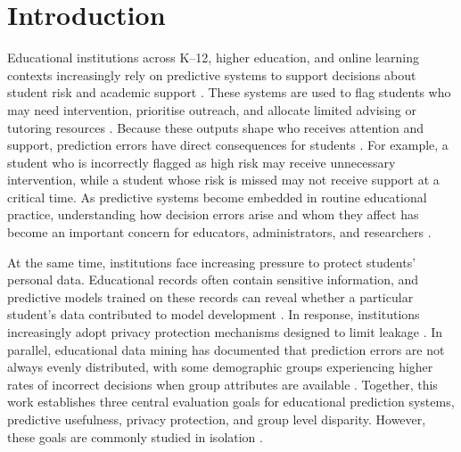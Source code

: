 \documentclass{edm_article}
\begin{document}

\section{Introduction}
Educational institutions across K–12, higher education, and online learning contexts increasingly rely on predictive systems to support decisions about student risk and academic support \cite{20hlosta2022_predictive_la_errors}. These systems are used to flag students who may need intervention, prioritise outreach, and allocate limited advising or tutoring resources \cite{3plak2022_ews_dashboard,17susnjak2022_la_dashboard_actionable}. Because these outputs shape who receives attention and support, prediction errors have direct consequences for students \cite{17susnjak2022_la_dashboard_actionable,20hlosta2022_predictive_la_errors}.  For example, a student who is incorrectly flagged as high risk may receive unnecessary intervention, while a student whose risk is missed may not receive support at a critical time. As predictive systems become embedded in routine educational practice, understanding how decision errors arise and whom they affect has become an important concern for educators, administrators, and researchers \cite{23gardner2019_abroca_slicing_fairness,24hutt2019evaluating-fairness-generalizability}.

At the same time, institutions face increasing pressure to protect students' personal data. Educational records often contain sensitive information, and predictive models trained on these records can reveal whether a particular student's data contributed to model development \cite{1shokri2017membership,4Yeom2017PrivacyRI,8niu2024_mia_survey}.
 In response, institutions increasingly adopt privacy protection mechanisms designed to limit leakage \cite{9abadi2016_dpsgd,12demelius2025recent-advances-dpdl}. In parallel, educational data mining has documented that prediction errors are not always evenly distributed, with some demographic groups experiencing higher rates of incorrect decisions when group attributes are available \cite{21Hu2020TowardsFE,23gardner2019_abroca_slicing_fairness}. Together, this work establishes three central evaluation goals for educational prediction systems, predictive usefulness, privacy protection, and group level disparity. However, these goals are commonly studied in isolation \cite{22gu2022_privacy_accuracy_fairness_fl}.
\end{document}
